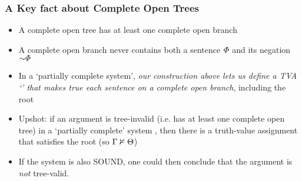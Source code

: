 \begin{frame}
\frametitle{A Key fact about Complete Open Trees}

\begin{itemize}[<+->]

\item A complete open tree has at least one complete open branch

\item A complete open branch never contains both a sentence $\varPhi{}$ and its negation $\enot \metaA{}$

\item In a `partially complete system', \emph{our construction above lets us define a TVA `' that makes true each sentence on a complete open branch}, including the root




\item Upshot: if an argument is tree-invalid (i.e. has at least one complete open tree) in a `partially complete' system , then there is a truth-value assignment that satisfies the root (so $\Gamma \nvDash \Theta$)

\item If the system is also SOUND, one could then conclude that the argument is \textit{not} tree-valid. 




\end{itemize}
\end{frame}

